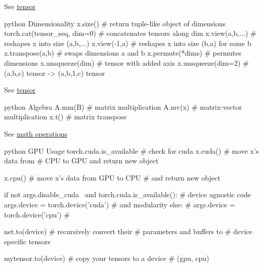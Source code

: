 \documentclass[10pt,a4paper]{article}
\begin{document}
\begin{multicols}{2}
See \href{https://pytorch.org/docs/stable/tensors.html}{tensor}

\begin{codebox}{python}{\hypertarget{dimensionality}{%
Dimensionality\label{dimensionality}}}
x.size()                        # return tuple-like object of dimensions
torch.cat(tensor_seq, dim=0)    # concatenates tensors along dim
x.view(a,b,...)                 # reshapes x into size (a,b,...)
x.view(-1,a)                    # reshapes x into size (b,a) for some b
x.transpose(a,b)                # swaps dimensions a and b
x.permute(*dims)                # permutes dimensions
x.unsqueeze(dim)                # tensor with added axis
x.unsqueeze(dim=2)              # (a,b,c) tensor -> (a,b,1,c) tensor
\end{codebox}

See \href{https://pytorch.org/docs/stable/tensors.html}{tensor}

\begin{codebox}{python}{\hypertarget{algebra}{%
Algebra\label{algebra}}}
A.mm(B)     # matrix multiplication
A.mv(x)     # matrix-vector multiplication
x.t()       # matrix transpose
\end{codebox}

See
\href{https://pytorch.org/docs/stable/torch.html?highlight=mm\#math-operations}{math
operations}

\begin{codebox}{python}{\hypertarget{gpu-usage}{%
GPU Usage\label{gpu-usage}}}
torch.cuda.is_available                 # check for cuda
x.cuda()                                # move x's data from
                                        # CPU to GPU and return new object

x.cpu()                                 # move x's data from GPU to CPU
                                        # and return new object

if not args.disable_cuda \
    and torch.cuda.is_available():      # device agnostic code
    args.device = torch.device('cuda')  # and modularity
else:                                   #
    args.device = torch.device('cpu')   #

net.to(device)                          # recursively convert their
                                        # parameters and buffers to
                                        # device specific tensors

mytensor.to(device)                     # copy your tensors to a device
                                        # (gpu, cpu)
\end{codebox}


\end{multicols}
\end{document}
